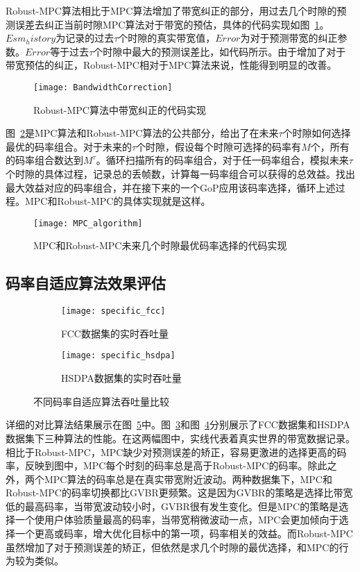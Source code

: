 Robust-MPC算法相比于MPC算法增加了带宽纠正的部分，用过去几个时隙的预测误差去纠正当前时隙MPC算法对于带宽的预估，具体的代码实现如图~\ref{fig:bandwidth_correction}。$Esm_history$为记录的过去$\tau$个时隙的真实带宽值，$Error$为对于预测带宽的纠正参数。$Error$等于过去$\tau$个时隙中最大的预测误差比，如代码所示。由于增加了对于带宽预估的纠正，Robust-MPC相对于MPC算法来说，性能得到明显的改善。
\begin{figure}[htb]
    \centering
    \texttt{[image: BandwidthCorrection]}
    \caption{Robust-MPC算法中带宽纠正的代码实现}
    \label{fig:bandwidth_correction}
\end{figure}

图~\ref{fig:MPC}是MPC算法和Robust-MPC算法的公共部分，给出了在未来$\tau$个时隙如何选择最优的码率组合。对于未来的$\tau$个时隙，假设每个时隙可选择的码率有$M$个，所有的码率组合数达到$M^\tau$。循环扫描所有的码率组合，对于任一码率组合，模拟未来$\tau$个时隙的具体过程，记录总的丢帧数，计算每一码率组合可以获得的总效益。找出最大效益对应的码率组合，并在接下来的一个GoP应用该码率选择，循环上述过程。MPC和Robust-MPC的具体实现就是这样。
\begin{figure}[htb]
    \centering
    \texttt{[image: MPC\_algorithm]}
    \caption{MPC和Robust-MPC未来几个时隙最优码率选择的代码实现}
    \label{fig:MPC}
\end{figure}

\subsection{码率自适应算法效果评估}
\begin{figure}[tb]
  \centering%
  \begin{subfigure}{0.5\textwidth}
    \texttt{[image: specific\_fcc]}
    \caption{FCC数据集的实时吞吐量}
    \label{fig:fcc}
  \end{subfigure}%
  \hfill
  \begin{subfigure}{0.5\textwidth}
    \texttt{[image: specific\_hsdpa]}
    \caption{HSDPA数据集的实时吞吐量}
    \label{fig:hsdpa}
  \end{subfigure}
  \vspace{0.1in}
  \caption{不同码率自适应算法吞吐量比较}
  \label{fig:specific}
\end{figure}

详细的对比算法结果展示在图~\ref{fig:specific}中。图~\ref{fig:fcc}和图~\ref{fig:hsdpa}分别展示了FCC数据集和HSDPA数据集下三种算法的性能。在这两幅图中，实线代表着真实世界的带宽数据记录。相比于Robust-MPC，MPC缺少对预测误差的矫正，容易更激进的选择更高的码率，反映到图中，MPC每个时刻的码率总是高于Robust-MPC的码率。除此之外，两个MPC算法的码率总是在真实带宽附近波动。两种数据集下，MPC和Robust-MPC的码率切换都比GVBR更频繁。这是因为GVBR的策略是选择比带宽低的最高码率，当带宽波动较小时，GVBR很有发生变化。但是MPC的策略是选择一个使用户体验质量最高的码率，当带宽稍微波动一点，MPC会更加倾向于选择一个更高或码率，增大优化目标中的第一项，码率相关的效益。而Robust-MPC虽然增加了对于预测误差的矫正，但依然是求几个时隙的最优选择，和MPC的行为较为类似。


